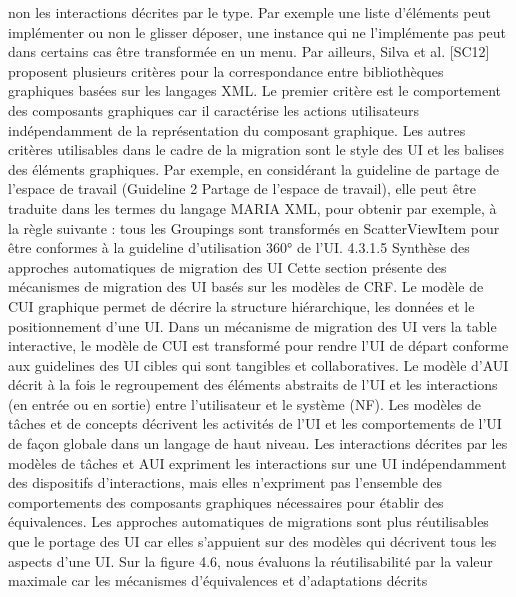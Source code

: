 \documentclass{article}
\begin{document}
non les interactions d\'{e}crites par le type. Par exemple une liste d’\'{e}l\'{e}ments peut impl\'{e}menter ou non
le glisser d\'{e}poser, une instance qui ne l’impl\'{e}mente pas peut dans certains cas \^{e}tre transform\'{e}e en un
menu.
Par ailleurs, Silva et al. [SC12] proposent plusieurs crit\`{e}res pour la correspondance entre biblioth\`{e}ques graphiques bas\'{e}es sur les langages XML. Le premier crit\`{e}re est le comportement des composants graphiques car il caract\'{e}rise les actions utilisateurs ind\'{e}pendamment de la repr\'{e}sentation du
composant graphique. Les autres crit\`{e}res utilisables dans le cadre de la migration sont le style des UI
et les balises des \'{e}l\'{e}ments graphiques. Par exemple, en consid\'{e}rant la guideline de partage de l’espace de travail (Guideline 2 Partage de l’espace de travail), elle peut \^{e}tre traduite dans les termes
du langage MARIA XML, pour obtenir par exemple, \`{a} la r\`{e}gle suivante : tous les Groupings sont
transform\'{e}s en ScatterViewItem pour \^{e}tre conformes \`{a} la guideline d’utilisation 360° de l’UI.
4.3.1.5
Synth\`{e}se des approches automatiques de migration des UI
Cette section pr\'{e}sente des m\'{e}canismes de migration des UI bas\'{e}s sur les mod\`{e}les de CRF. Le
mod\`{e}le de CUI graphique permet de d\'{e}crire la structure hi\'{e}rarchique, les donn\'{e}es et le positionnement
d’une UI. Dans un m\'{e}canisme de migration des UI vers la table interactive, le mod\`{e}le de CUI est
transform\'{e} pour rendre l’UI de d\'{e}part conforme aux guidelines des UI cibles qui sont tangibles et
collaboratives.
Le mod\`{e}le d’AUI d\'{e}crit \`{a} la fois le regroupement des \'{e}l\'{e}ments abstraits de l’UI et les interactions
(en entr\'{e}e ou en sortie) entre l’utilisateur et le syst\`{e}me (NF). Les mod\`{e}les de t\^{a}ches et de concepts
d\'{e}crivent les activit\'{e}s de l’UI et les comportements de l’UI de fa\c{c}on globale dans un langage de haut
niveau.
Les interactions d\'{e}crites par les mod\`{e}les de t\^{a}ches et AUI expriment les interactions sur une UI
ind\'{e}pendamment des dispositifs d’interactions, mais elles n’expriment pas l’ensemble des comportements des composants graphiques n\'{e}cessaires pour \'{e}tablir des \'{e}quivalences.
Les approches automatiques de migrations sont plus r\'{e}utilisables que le portage des UI car elles
s’appuient sur des mod\`{e}les qui d\'{e}crivent tous les aspects d’une UI. Sur la ﬁgure 4.6, nous \'{e}valuons
la r\'{e}utilisabilit\'{e} par la valeur maximale car les m\'{e}canismes d’\'{e}quivalences et d’adaptations d\'{e}crits
\end{document}
